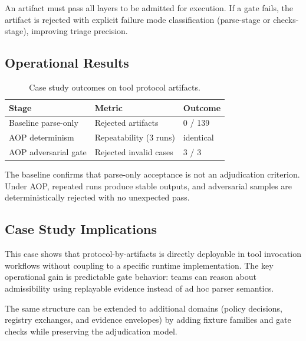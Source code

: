 An artifact must pass all layers to be admitted for execution.
If a gate fails, the artifact is rejected with explicit failure mode
classification (parse-stage or checks-stage), improving triage precision.

\subsection{Operational Results}

\begin{table}[t]
\centering
\caption{Case study outcomes on tool protocol artifacts.}
\begin{tabular}{lll}
\toprule
Stage & Metric & Outcome \\
\midrule
Baseline parse-only & Rejected artifacts & 0 / 139 \\
AOP determinism & Repeatability (3 runs) & identical \\
AOP adversarial gate & Rejected invalid cases & 3 / 3 \\
\bottomrule
\end{tabular}
\end{table}

The baseline confirms that parse-only acceptance is not an adjudication
criterion. Under AOP, repeated runs produce stable outputs, and adversarial
samples are deterministically rejected with no unexpected pass.

\subsection{Case Study Implications}

This case shows that protocol-by-artifacts is directly deployable in tool
invocation workflows without coupling to a specific runtime implementation.
The key operational gain is predictable gate behavior: teams can reason
about admissibility using replayable evidence instead of ad hoc parser
semantics.

The same structure can be extended to additional domains (policy decisions,
registry exchanges, and evidence envelopes) by adding fixture families and
gate checks while preserving the adjudication model.
